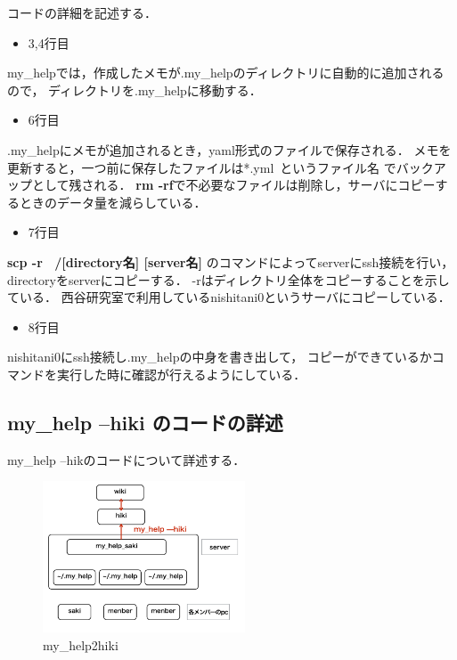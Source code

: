 \newpage
コードの詳細を記述する．
\begin{itemize}
\item 3,4行目
\end{itemize}
\begin{description}
\item my\_helpでは，作成したメモが.my\_helpのディレクトリに自動的に追加されるので，
ディレクトリを.my\_helpに移動する．
\end{description}
\begin{itemize}
\item 6行目
\end{itemize}
\begin{description}
\item .my\_helpにメモが追加されるとき，yaml形式のファイルで保存される．
メモを更新すると，一つ前に保存したファイルは*.yml~というファイル名
でバックアップとして残される．
\textbf{rm -rf}で不必要なファイルは削除し，サーバにコピーするときのデータ量を減らしている．
\end{description}

\begin{itemize}
\item 7行目
\end{itemize}
\begin{description}
\item
\textbf{scp -r ~/[directory名] [server名]}
のコマンドによってserverにssh接続を行い，directoryをserverにコピーする．
-rはディレクトリ全体をコピーすることを示している．
西谷研究室で利用しているnishitani0というサーバにコピーしている．
\end{description}

\begin{itemize}
\item 8行目
\end{itemize}
\begin{description}
\item nishitani0にssh接続し.my\_helpの中身を書き出して，
コピーができているかコマンドを実行した時に確認が行えるようにしている．
\end{description}

\newpage

\subsection{my\_help --hiki のコードの詳述}
my\_help --hikのコードについて詳述する．

\begin{figure}[htbp]\begin{center}
\includegraphics[width=6cm,bb=100 100 600 800]{my_help2hiki_saki.013.png}
\caption{my\_help2hiki}
\label{default}\end{center}\end{figure}

